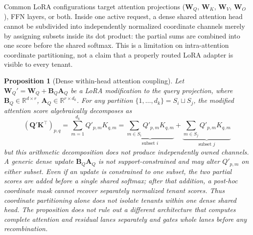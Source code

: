 \documentclass[11pt,a4paper]{article}
\newtheorem{proposition}[theorem]{Proposition}
\newcommand{\R}{\mathbb{R}}
\newcommand{\bW}{\mathbf{W}}
\newcommand{\bQ}{\mathbf{Q}}
\newcommand{\bK}{\mathbf{K}}
\begin{document}
Common LoRA configurations target attention projections ($\bW_Q$,
$\bW_K$, $\bW_V$, $\bW_O$), FFN layers, or both.  Inside one active
request, a dense shared attention head cannot be subdivided into
independently normalized coordinate channels merely by assigning
subsets inside its dot product: the partial sums are combined into one
score before the shared softmax.  This is a limitation on
intra-attention coordinate partitioning, not a claim that a properly
routed LoRA adapter is visible to every tenant.

\begin{proposition}[Dense within-head attention coupling]
\label{prop:attention-entanglement}
Let $\bW_Q' = \bW_Q + \mathbf{B}_Q\mathbf{A}_Q$ be a LoRA
modification to the query projection, where
$\mathbf{B}_Q \in \R^{d \times r}$,
$\mathbf{A}_Q \in \R^{r \times d_k}$.  For any partition
$\{1, \ldots, d_k\} = S_i \sqcup S_j$, the modified attention
score algebraically decomposes as
\[
    (\bQ'\bK^\top)_{p,q} = \sum_{m=1}^{d_k} Q'_{p,m} K_{q,m}
    = \underbrace{\sum_{m \in S_i} Q'_{p,m} K_{q,m}}_{\text{subset } i}
    + \underbrace{\sum_{m \in S_j} Q'_{p,m} K_{q,m}}_{\text{subset } j}
\]
but this arithmetic decomposition does not produce independently
owned channels.  A generic dense update
$\mathbf{B}_Q\mathbf{A}_Q$ is not support-constrained and may alter
$Q'_{p,m}$ on either subset.  Even if an update is constrained to one
subset, the two partial scores are added before a single shared
softmax; after that addition, a post-hoc coordinate mask cannot
recover separately normalized tenant scores.  Thus coordinate
partitioning alone does not isolate tenants within one dense shared
head.  The proposition does not rule out a different architecture
that computes complete attention and residual lanes separately and
gates whole lanes before any recombination.
\end{proposition}
\end{document}
